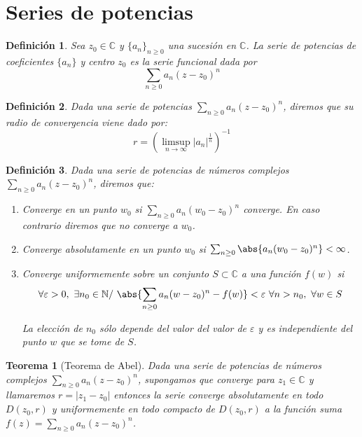 \documentclass[10pt]{book}
\newtheorem{defi}{Definición}[chapter]
\newtheorem{theorem}{Teorema}[chapter]
\newcommand{\C}{\mathbb{C}}
\newcommand{\N}{\mathbb{N}}
\begin{document}
\section{Series de potencias}

\begin{defi}
Sea $z_0\in \C$ y $\{a_n\}_{n\geq 0}$ una sucesión en $\C$. La serie de potencias de coeficientes $\{a_n\}$ y centro $z_0$ es la serie funcional dada por
$$
\sum_{n\geq 0} a_n(z-z_0)^n
$$ 
\end{defi}

\begin{defi}
Dada una serie de potencias $\sum_{n\geq 0} a_n(z-z_0)^n$, diremos que su radio de convergencia viene dado por:
$$
r = \left(\limsup_{n\to \infty} |a_n|^{\frac{1}{n}}\right)^{-1}
$$
\end{defi}

\begin{defi}
Dada una serie de potencias de números complejos $\sum_{n\geq 0} a_n(z-z_0)^n$, diremos que:

\begin{enumerate}
\item Converge en un punto $w_0$ si $\sum_{n\geq 0} a_n(w_0-z_0)^n$ converge. En caso contrario diremos que no converge a $w_0$.
\item Converge absolutamente en un punto $w_0$ si $\sum_{n\geq 0} \abs{a_n(w_0-z_0)^n}<\infty$.
\item Converge uniformemente sobre un conjunto $S \subset \C$ a una función $f(w)$ si 
$$
\forall\varepsilon>0,\ \exists n_0\in\N /\ \abs{\sum_{n\geq 0} a_n(w-z_0)^n-f(w)}<\varepsilon \ \forall n> n_0,\ \forall w\in S
$$

La elección de $n_0$ sólo depende del valor del valor de $\varepsilon$ y es independiente del punto $w$ que se tome de $S$.
\end{enumerate}
\end{defi}


\begin{theorem}[Teorema de Abel]
Dada una serie de potencias de números complejos  $\sum_{n\geq 0} a_n(z-z_0)^n$, supongamos que converge para $z_1\in\C$ y llamaremos $r = |z_1-z_0|$ entonces la serie converge absolutamente en todo $D(z_0,r)$ y uniformemente en todo compacto de $D(z_0,r)$ a la función suma $f(z) =  \sum_{n\geq 0} a_n(z-z_0)^n$.
\end{theorem}
\end{document}

